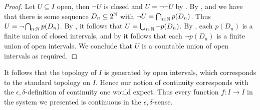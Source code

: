 \begin{proof}
  Let $U\subseteq I$ open, then $\neg U$ is closed and $U = \neg \neg U$ by . 
  By ,  and 
  we have that there is some sequence $D_n\subseteq 2^{\mathbb{N}}$ with $\neg U = \bigcap_{n:\mathbb{N}} p(D_n)$. 
  Thus $U = \neg \bigcap_{n:\mathbb{N}} p(D_n)$. 
  By , it follows that $U = \bigcup_{n:\mathbb{N}} \neg p(D_n)$. 
  By , each $p(D_n)$ is a finite union of closed intervals, 
  and by  it follows that each $\neg p(D_n)$ is a finite union of open intervals. 
  We conclude that $U$ is a countable union of open intervals as required. 
\end{proof}
%
%

\begin{remark}
  It follows that the topology of $I$ is generated by open intervals, 
  which corresponds to the standard topology on $I$. 
  Hence our notion of continuity corresponds with the $\epsilon,\delta$-definition of continuity one would expect. 
  Thus every function $f:I\to I$ in the system we presented is continuous in the $\epsilon,\delta$-sense. 
\end{remark}
